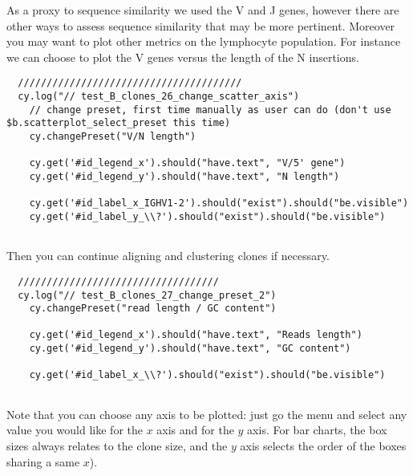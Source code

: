 As a proxy to sequence similarity we used the V and J genes, however there are
other ways to assess sequence similarity that may be more pertinent.
Moreover you may want to plot other metrics on the lymphocyte population.
%
For instance we can choose to plot the V genes versus the length of the N
insertions.
\begin{verbatim}
  ///////////////////////////////////////
  cy.log("// test_B_clones_26_change_scatter_axis")
    // change preset, first time manually as user can do (don't use $b.scatterplot_select_preset this time)
    cy.changePreset("V/N length")

    cy.get('#id_legend_x').should("have.text", "V/5' gene")
    cy.get('#id_legend_y').should("have.text", "N length")

    cy.get('#id_label_x_IGHV1-2').should("exist").should("be.visible")
    cy.get('#id_label_y_\\?').should("exist").should("be.visible")


\end{verbatim}

Then you can continue aligning and clustering clones if necessary.

\begin{verbatim}
  ///////////////////////////////////
  cy.log("// test_B_clones_27_change_preset_2")
    cy.changePreset("read length / GC content")

    cy.get('#id_legend_x').should("have.text", "Reads length")
    cy.get('#id_legend_y').should("have.text", "GC content")

    cy.get('#id_label_x_\\?').should("exist").should("be.visible")


\end{verbatim}

Note that you can choose any axis to be plotted: just go the  menu and
select any value you would like for the $x$ axis and for the $y$ axis.
For bar charts, the box sizes always relates to the clone size,
and the $y$ axis selects the order of the boxes sharing a same $x$).


